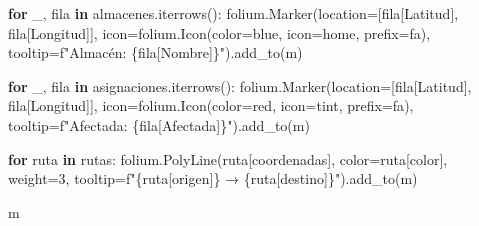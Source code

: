 \documentclass[
  spanish,
  us-letterpaper,
]{scrreprt}
\newenvironment{Shaded}{\begin{snugshade}}{\end{snugshade}}
\newcommand{\ControlFlowTok}[1]{\textcolor[rgb]{0.00,0.23,0.31}{\textbf{#1}}}
\newcommand{\DecValTok}[1]{\textcolor[rgb]{0.68,0.00,0.00}{#1}}
\newcommand{\KeywordTok}[1]{\textcolor[rgb]{0.00,0.23,0.31}{\textbf{#1}}}
\newcommand{\NormalTok}[1]{\textcolor[rgb]{0.00,0.23,0.31}{#1}}
\newcommand{\OperatorTok}[1]{\textcolor[rgb]{0.37,0.37,0.37}{#1}}
\newcommand{\SpecialCharTok}[1]{\textcolor[rgb]{0.37,0.37,0.37}{#1}}
\newcommand{\SpecialStringTok}[1]{\textcolor[rgb]{0.13,0.47,0.30}{#1}}
\newcommand{\StringTok}[1]{\textcolor[rgb]{0.13,0.47,0.30}{#1}}
\numberwithin{equation}{chapter} %
\begin{document}
\begin{Shaded}
\begin{Highlighting}[]
\ControlFlowTok{for}\NormalTok{ \_, fila }\KeywordTok{in}\NormalTok{ almacenes.iterrows():}
\NormalTok{    folium.Marker(location}\OperatorTok{=}\NormalTok{[fila[}\StringTok{\textquotesingle{}Latitud\textquotesingle{}}\NormalTok{],}
\NormalTok{     fila[}\StringTok{\textquotesingle{}Longitud\textquotesingle{}}\NormalTok{]],}
\NormalTok{                  icon}\OperatorTok{=}\NormalTok{folium.Icon(color}\OperatorTok{=}\StringTok{\textquotesingle{}blue\textquotesingle{}}\NormalTok{,}
\NormalTok{                   icon}\OperatorTok{=}\StringTok{\textquotesingle{}home\textquotesingle{}}\NormalTok{, prefix}\OperatorTok{=}\StringTok{\textquotesingle{}fa\textquotesingle{}}\NormalTok{),}
\NormalTok{                  tooltip}\OperatorTok{=}\SpecialStringTok{f"Almacén: }\SpecialCharTok{\{}\NormalTok{fila[}\StringTok{\textquotesingle{}Nombre\textquotesingle{}}\NormalTok{]}\SpecialCharTok{\}}\SpecialStringTok{"}\NormalTok{).add\_to(m)}

\ControlFlowTok{for}\NormalTok{ \_, fila }\KeywordTok{in}\NormalTok{ asignaciones.iterrows():}
\NormalTok{    folium.Marker(location}\OperatorTok{=}\NormalTok{[fila[}\StringTok{\textquotesingle{}Latitud\textquotesingle{}}\NormalTok{],}
\NormalTok{     fila[}\StringTok{\textquotesingle{}Longitud\textquotesingle{}}\NormalTok{]],}
\NormalTok{            icon}\OperatorTok{=}\NormalTok{folium.Icon(color}\OperatorTok{=}\StringTok{\textquotesingle{}red\textquotesingle{}}\NormalTok{,}
\NormalTok{                icon}\OperatorTok{=}\StringTok{\textquotesingle{}tint\textquotesingle{}}\NormalTok{, prefix}\OperatorTok{=}\StringTok{\textquotesingle{}fa\textquotesingle{}}\NormalTok{),}
\NormalTok{            tooltip}\OperatorTok{=}\SpecialStringTok{f"Afectada: }\SpecialCharTok{\{}\NormalTok{fila[}\StringTok{\textquotesingle{}Afectada\textquotesingle{}}\NormalTok{]}\SpecialCharTok{\}}\SpecialStringTok{"}\NormalTok{).add\_to(m)}

\ControlFlowTok{for}\NormalTok{ ruta }\KeywordTok{in}\NormalTok{ rutas:}
\NormalTok{    folium.PolyLine(ruta[}\StringTok{\textquotesingle{}coordenadas\textquotesingle{}}\NormalTok{], color}\OperatorTok{=}\NormalTok{ruta[}\StringTok{\textquotesingle{}color\textquotesingle{}}\NormalTok{], weight}\OperatorTok{=}\DecValTok{3}\NormalTok{,}
\NormalTok{        tooltip}\OperatorTok{=}\SpecialStringTok{f"}\SpecialCharTok{\{}\NormalTok{ruta[}\StringTok{\textquotesingle{}origen\textquotesingle{}}\NormalTok{]}\SpecialCharTok{\}}\SpecialStringTok{ → }\SpecialCharTok{\{}\NormalTok{ruta[}\StringTok{\textquotesingle{}destino\textquotesingle{}}\NormalTok{]}\SpecialCharTok{\}}\SpecialStringTok{"}\NormalTok{).add\_to(m)}

\NormalTok{m}
\end{Highlighting}
\end{Shaded}
\end{document}
